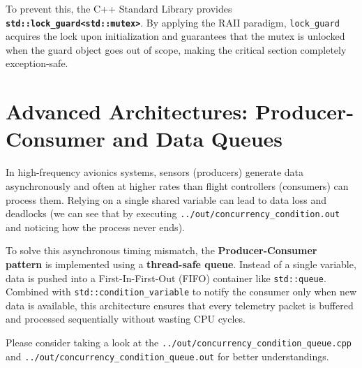 \documentclass{article}
\begin{document}
To prevent this, the C++ Standard Library provides \textbf{\texttt{std::lock\_guard\textless std::mutex\textgreater}}. 
By applying the RAII paradigm, \texttt{lock\_guard} acquires the lock upon initialization and guarantees that the mutex is unlocked when the guard object 
goes out of scope, making the critical section completely exception-safe.

\section{Advanced Architectures: Producer-Consumer and Data Queues}
In high-frequency avionics systems, sensors (producers) generate data asynchronously and often at higher rates than flight controllers (consumers) can process them. 
Relying on a single shared variable can lead to data loss and deadlocks (we can see that by executing \texttt{../out/concurrency\_condition.out} and noticing how the process never ends).

To solve this asynchronous timing mismatch, the \textbf{Producer-Consumer pattern} is implemented using a \textbf{thread-safe queue}. 
Instead of a single variable, data is pushed into a First-In-First-Out (FIFO) container like \texttt{std::queue}. 
Combined with \texttt{std::condition\_variable} to notify the consumer only when new data is available, 
this architecture ensures that every telemetry packet is buffered and processed sequentially without wasting CPU cycles.

Please consider taking a look at the \texttt{../out/concurrency\_condition\_queue.cpp} and \newline
\texttt{../out/concurrency\_condition\_queue.out} for better understandings.
\end{document}

